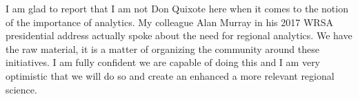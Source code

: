 \documentclass[11pt]{article}
\begin{document}
I am glad to report that I am not Don Quixote here when it comes to the notion
of the importance of analytics. My colleague Alan Murray in his 2017 WRSA
presidential address \citep{Murray_2017_ars} actually spoke about the need for
regional analytics. We have the raw material, it is a matter of organizing the
community around these initiatives. I am fully confident we are capable of doing
this and I am very optimistic that we will do so and create an enhanced a
more relevant regional science.



\end{document}
